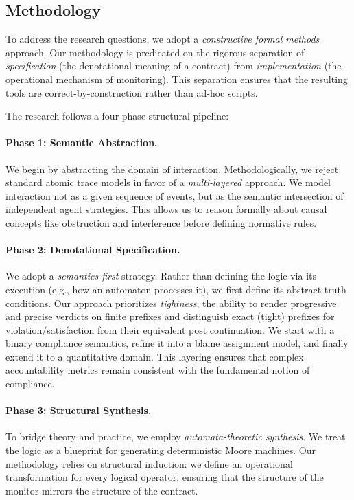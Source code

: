 \documentclass{article}
\begin{document}
\subsection{Methodology}

To address the research questions, we adopt a \emph{constructive formal methods} approach.
Our methodology is predicated on the rigorous separation of \emph{specification} (the denotational meaning of a contract) from \emph{implementation} (the operational mechanism of monitoring).
This separation ensures that the resulting tools are correct-by-construction rather than ad-hoc scripts.

The research follows a four-phase structural pipeline:

\paragraph{Phase 1: Semantic Abstraction.}
We begin by abstracting the domain of interaction.
Methodologically, we reject standard atomic trace models in favor of a \emph{multi-layered} approach.
We model interaction not as a given sequence of events, but as the semantic intersection of independent agent strategies.
This allows us to reason formally about causal concepts like obstruction and interference before defining normative rules.

\paragraph{Phase 2: Denotational Specification.}
We adopt a \emph{semantics-first} strategy.
Rather than defining the logic via its execution (e.g., how an automaton processes it), we first define its abstract truth conditions.
Our approach prioritizes \emph{tightness}, the ability to render progressive and precise verdicts on finite prefixes and distinguish exact (tight) prefixes for violation/satisfaction from their equivalent post continuation.
We start with a binary compliance semantics, refine it into a blame assignment model, and finally extend it to a quantitative domain.
This layering ensures that complex accountability metrics remain consistent with the fundamental notion of compliance.

\paragraph{Phase 3: Structural Synthesis.}
To bridge theory and practice, we employ \emph{automata-theoretic synthesis}.
We treat the logic as a blueprint for generating deterministic Moore machines.
Our methodology relies on structural induction: we define an operational transformation for every logical operator, ensuring that the structure of the monitor mirrors the structure of the contract.
\end{document}
